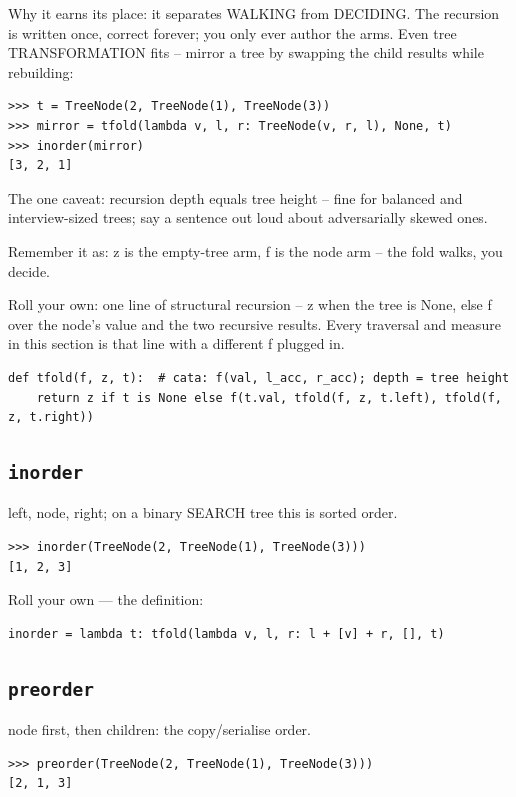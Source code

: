\documentclass[10pt,letterpaper]{book}
\begin{document}
Why it earns its place: it separates WALKING from DECIDING. The recursion is written once, correct forever; you only ever author the arms. Even tree TRANSFORMATION fits -- mirror a tree by swapping the child results while rebuilding:

\begin{lstlisting}[style=ex]
>>> t = TreeNode(2, TreeNode(1), TreeNode(3))
>>> mirror = tfold(lambda v, l, r: TreeNode(v, r, l), None, t)
>>> inorder(mirror)
[3, 2, 1]
\end{lstlisting}

The one caveat: recursion depth equals tree height -- fine for balanced and interview-sized trees; say a sentence out loud about adversarially skewed ones.


Remember it as: z is the empty-tree arm, f is the node arm -- the fold walks, you decide.


Roll your own: one line of structural recursion -- z when the tree is None, else f over the node's value and the two recursive results. Every traversal and measure in this section is that line with a different f plugged in.

\begin{lstlisting}[style=ex]
def tfold(f, z, t):  # cata: f(val, l_acc, r_acc); depth = tree height
    return z if t is None else f(t.val, tfold(f, z, t.left), tfold(f, z, t.right))
\end{lstlisting}

\subsection{\texttt{inorder}}\label{def:inorder}
left, node, right; on a binary SEARCH tree this is sorted order.
\begin{lstlisting}[style=ex]
>>> inorder(TreeNode(2, TreeNode(1), TreeNode(3)))
[1, 2, 3]
\end{lstlisting}

Roll your own --- the definition:

\begin{lstlisting}[style=ex]
inorder = lambda t: tfold(lambda v, l, r: l + [v] + r, [], t)
\end{lstlisting}
\subsection{\texttt{preorder}}\label{def:preorder}
node first, then children: the copy/serialise order.
\begin{lstlisting}[style=ex]
>>> preorder(TreeNode(2, TreeNode(1), TreeNode(3)))
[2, 1, 3]
\end{lstlisting}
\end{document}
